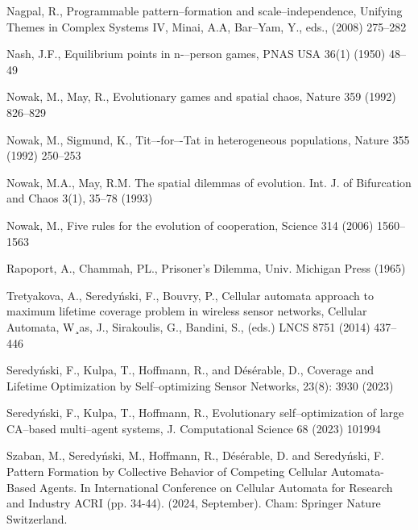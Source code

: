 \documentclass[10pt,a4paper]{article}  %
\begin{document}
\begin{thebibliography}{99}
Nagpal, R., Programmable pattern–formation and scale–independence, Unifying
Themes in Complex Systems IV, Minai, A.A, Bar–Yam, Y., eds., (2008) 275--282

Nash, J.F., Equilibrium points in n-–person games, PNAS USA 36(1) (1950) 48--49

Nowak, M., May, R., Evolutionary games and spatial chaos, Nature 359 (1992)
826--829

Nowak, M., Sigmund, K., Tit–-for–-Tat in heterogeneous populations, Nature 355
(1992) 250--253

Nowak, M.A., May, R.M. The spatial dilemmas of evolution. 
Int. J. of Bifurcation and Chaos 3(1), 35--78 (1993)

Nowak, M., Five rules for the evolution of cooperation, Science 314 (2006) 1560--1563

Rapoport, A., Chammah, PL., Prisoner's Dilemma, Univ. Michigan Press (1965)

Tretyakova, A., Seredy\'{n}ski, F., Bouvry, P., Cellular automata approach to maximum lifetime coverage problem in wireless sensor networks, Cellular Automata,
W¸as, J., Sirakoulis, G., Bandini, S., (eds.) LNCS 8751 (2014) 437--446

Seredy\'{n}ski, F., Kulpa, T., Hoffmann, R., and D\'{e}s\'{e}rable, D.,
Coverage and Lifetime Optimization by Self--optimizing Sensor Networks,
 23(8): 3930 (2023)

Seredy\'{n}ski, F., Kulpa, T., Hoffmann, R., Evolutionary self--optimization of large
CA--based multi--agent systems, J. Computational Science 68 (2023) 101994


Szaban, M., Seredy\'{n}ski, M., Hoffmann, R., D\'{e}s\'{e}rable, D. and Seredy\'{n}ski, F.
Pattern Formation by Collective Behavior of Competing Cellular Automata-Based Agents. 
In International Conference on Cellular Automata for Research and Industry ACRI (pp. 34-44). 
(2024, September). 
Cham: Springer Nature Switzerland.


\end{thebibliography}
\end{document}
